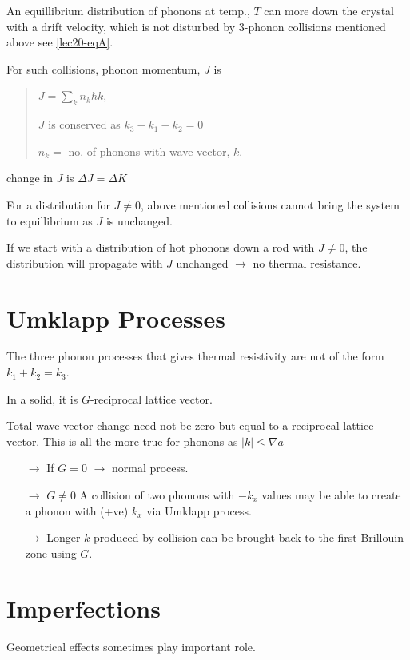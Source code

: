 An equillibrium distribution of phonons at temp., $T$ can more down the crystal with a drift velocity, which is not disturbed by $3$-phonon collisions mentioned above see \eqref{lec20-eqA}.

For such collisions, phonon momentum, $J$ is 
\begin{quote}
$J=\sum\limits_{k}n_{k}\hbar k$,

$J$ is conserved as $k_{3}-k_{1}-k_{2}=0$

$n_{k}=$ no. of phonons with wave vector, $k$.
\end{quote}
change in $J$ is \quad $\Delta J=\Delta K$

For a distribution for $J\neq 0$, above mentioned collisions cannot bring the system to equillibrium as $J$ is unchanged.

If we start with a distribution of hot phonons down a rod with $J\neq 0$, the distribution will propagate with $J$ unchanged $\to$ no thermal resistance.

\section*{Umklapp Processes}

The three phonon processes that gives thermal resistivity are not of the form $k_{1}+k_{2}=k_{3}$.

In a solid, it is  $G$-reciprocal lattice vector.

Total wave vector change need not be zero but equal to a reciprocal lattice vector. This is all the more true for phonons as $|k|\leq \nabla a$
\begin{itemize}
\item[$\to$] If $G=0$ $\to$ normal process.

\item[$\to$] $G\neq 0$ A collision of two phonons with $-k_{x}$ values may be able to create a phonon with (+ve) $k_{x}$ via Umklapp process.

\item[$\to$] Longer $k$ produced by collision can be brought back to the first Brillouin zone using $G$.
\end{itemize}

\section*{Imperfections}

Geometrical effects sometimes play important role.

